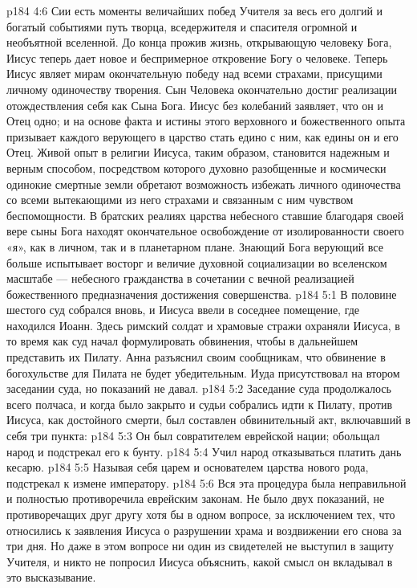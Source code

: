 \vs p184 4:6 Сии есть моменты величайших побед Учителя за весь его долгий и богатый событиями путь творца, вседержителя и спасителя огромной и необъятной вселенной. До конца прожив жизнь, открывающую человеку Бога, Иисус теперь дает новое и беспримерное откровение Богу о человеке. Теперь Иисус являет мирам окончательную победу над всеми страхами, присущими личному одиночеству творения. Сын Человека окончательно достиг реализации отождествления себя как Сына Бога. Иисус без колебаний заявляет, что он и Отец одно; и на основе факта и истины этого верховного и божественного опыта призывает каждого верующего в царство стать едино с ним, как едины он и его Отец. Живой опыт в религии Иисуса, таким образом, становится надежным и верным способом, посредством которого духовно разобщенные и космически одинокие смертные земли обретают возможность избежать личного одиночества со всеми вытекающими из него страхами и связанным с ним чувством беспомощности. В братских реалиях царства небесного ставшие благодаря своей вере сыны Бога находят окончательное освобождение от изолированности своего «я», как в личном, так и в планетарном плане. Знающий Бога верующий все больше испытывает восторг и величие духовной социализации во вселенском масштабе --- небесного гражданства в сочетании с вечной реализацией божественного предназначения достижения совершенства.
\vs p184 5:1 В половине шестого суд собрался вновь, и Иисуса ввели в соседнее помещение, где находился Иоанн. Здесь римский солдат и храмовые стражи охраняли Иисуса, в то время как суд начал формулировать обвинения, чтобы в дальнейшем представить их Пилату. Анна разъяснил своим сообщникам, что обвинение в богохульстве для Пилата не будет убедительным. Иуда присутствовал на втором заседании суда, но показаний не давал.
\vs p184 5:2 Заседание суда продолжалось всего полчаса, и когда было закрыто и судьи собрались идти к Пилату, против Иисуса, как достойного смерти, был составлен обвинительный акт, включавший в себя три пункта:
\vs p184 5:3 \bibnobreakspace Он был совратителем еврейской нации; обольщал народ и подстрекал его к бунту.
\vs p184 5:4 \bibnobreakspace Учил народ отказываться платить дань кесарю.
\vs p184 5:5 \bibnobreakspace Называя себя царем и основателем царства нового рода, подстрекал к измене императору.
\vs p184 5:6 \pc Вся эта процедура была неправильной и полностью противоречила еврейским законам. Не было двух показаний, не противоречащих друг другу хотя бы в одном вопросе, за исключением тех, что относились к заявления Иисуса о разрушении храма и воздвижении его снова за три дня. Но даже в этом вопросе ни один из свидетелей не выступил в защиту Учителя, и никто не попросил Иисуса объяснить, какой смысл он вкладывал в это высказывание.
